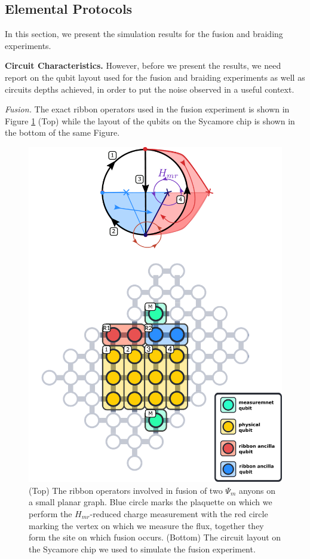 \documentclass[two column]{article}
\begin{document}
\subsection{Elemental Protocols}

In this section, we present the simulation results for the fusion and braiding experiments.

\textbf{Circuit Characteristics.} However, before we present the results, we need report on the qubit layout used for the fusion and braiding experiments as well as circuits depths achieved, in order to put the noise observed in a useful context.

\emph{Fusion.} 
The exact ribbon operators used in the fusion experiment is shown in Figure \ref{fig:fusion_setup} (Top) while the layout of the qubits on the Sycamore chip is shown in the bottom of the same Figure.
\begin{figure}
	\centering
	\includegraphics[width=\linewidth]{Figures/basket_fusion.pdf}
	\caption{(Top) The ribbon operators involved in fusion of two $\Psi_m$ anyons on a small planar graph. Blue circle marks the plaquette on which we perform the $H_{mr}$-reduced charge measurement with the red circle marking the vertex on which we measure the flux, together they form the site on which fusion occurs. (Bottom) The circuit layout on the Sycamore chip we used to simulate the fusion experiment.}
	\label{fig:fusion_setup}
\end{figure}
\end{document}

